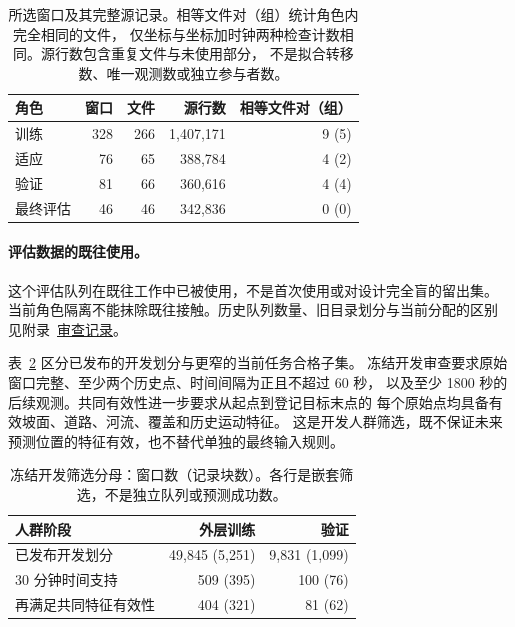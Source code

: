 \begin{table}[htbp]
\centering\small
\caption{所选窗口及其完整源记录。相等文件对（组）统计角色内完全相同的文件，
仅坐标与坐标加时钟两种检查计数相同。源行数包含重复文件与未使用部分，
不是拟合转移数、唯一观测数或独立参与者数。}
\label{tab:source-sequence-screen}\hypertarget{tab:source-sequence-screen}{}
\begin{tabular}{@{}lrrrr@{}}
\toprule
角色 & 窗口 & 文件 & 源行数 & 相等文件对（组）\\
\midrule
训练 & 328 & 266 & 1,407,171 & 9 (5)\\
适应 & 76 & 65 & 388,784 & 4 (2)\\
验证 & 81 & 66 & 360,616 & 4 (4)\\
最终评估 & 46 & 46 & 342,836 & 0 (0)\\
\bottomrule
\end{tabular}
\end{table}

\paragraph{评估数据的既往使用。}
这个评估队列在既往工作中已被使用，不是首次使用或对设计完全盲的留出集。
当前角色隔离不能抹除既往接触。历史队列数量、旧目录划分与当前分配的区别
见附录~\href{audit-notes.pdf\#sec:source-reconciliation-details}{审查记录}。

表~\ref{tab:cohort-denominators} 区分已发布的开发划分与更窄的当前任务合格子集。
冻结开发审查要求原始窗口完整、至少两个历史点、时间间隔为正且不超过 60 秒，
以及至少 1800 秒的后续观测。共同有效性进一步要求从起点到登记目标末点的
每个原始点均具备有效坡面、道路、河流、覆盖和历史运动特征。
这是开发人群筛选，既不保证未来预测位置的特征有效，也不替代单独的最终输入规则。

\begin{table}[htbp]
\centering\small
\caption{冻结开发筛选分母：窗口数（记录块数）。各行是嵌套筛选，不是独立队列或预测成功数。}
\label{tab:cohort-denominators}\hypertarget{tab:cohort-denominators}{}
\begin{tabular}{@{}p{.46\linewidth}rr@{}}
\toprule
人群阶段 & 外层训练 & 验证\\
\midrule
已发布开发划分 & 49,845 (5,251) & 9,831 (1,099)\\
30 分钟时间支持 & 509 (395) & 100 (76)\\
再满足共同特征有效性 & 404 (321) & 81 (62)\\
\bottomrule
\end{tabular}
\end{table}

